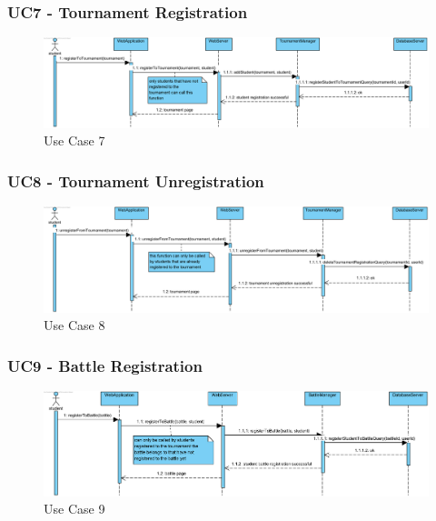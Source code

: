 \documentclass{article}
\begin{document}
\subsubsection*{UC7 - Tournament Registration}

\begin{figure}[H]
    \centering
    \includegraphics[width=1\textwidth]{images/UseCaseSequenceDiagrams/UC7}
    \caption{Use Case 7}
    \label{fig:UC7}
\end{figure}

\subsubsection*{UC8 - Tournament Unregistration}

\begin{figure}[H]
    \centering
    \includegraphics[width=1\textwidth]{images/UseCaseSequenceDiagrams/UC8}
    \caption{Use Case 8}
    \label{fig:UC8}
\end{figure}

\subsubsection*{UC9 - Battle Registration}

\begin{figure}[H]
    \centering
    \includegraphics[width=1\textwidth]{images/UseCaseSequenceDiagrams/UC9}
    \caption{Use Case 9}
    \label{fig:UC9}
\end{figure}
\end{document}
